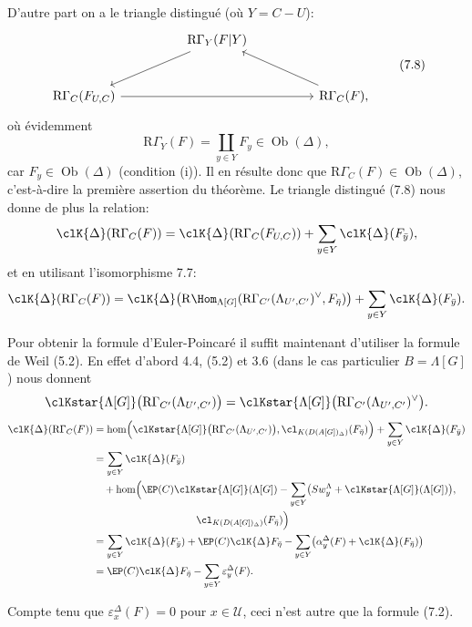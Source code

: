 D'autre part on a le triangle distingué (où $Y=C-U$):
\[
\begin{tikzcd}[column sep=huge,row sep=large]
& \mathrm{R}\Gamma_Y(F|Y) \arrow[dl] & \\
\mathrm{R}\Gamma_C(F_{U,C}) \arrow[rr] && \mathrm{R}\Gamma_C(F), \arrow[ul]
\end{tikzcd}
\tag{7.8}
\]
où évidemment
\[
\mathrm{R}\Gamma_Y(F)=\coprod_{y\in Y}F_y\in\operatorname{Ob}(\Delta),
\]
car $F_y\in\operatorname{Ob}(\Delta)$ (condition (i)). Il en résulte donc que $\mathrm{R}\Gamma_C(F)\in\operatorname{Ob}(\Delta)$, c'est-à-dire la première assertion du théorème. Le triangle distingué (7.8) nous donne de plus la relation:
\[
\clK{\Delta}(\mathrm{R}\Gamma_C(F))
=
\clK{\Delta}(\mathrm{R}\Gamma_C(F_{U,C}))
+\sum_{y\in Y}\clK{\Delta}(F_{\bar y}),
\]
et en utilisant l'isomorphisme 7.7:
\[
\clK{\Delta}(\mathrm{R}\Gamma_C(F))
=
\clK{\Delta}\bigl(\mathrm{R}\Hom_{\Lambda[G]}(\mathrm{R}\Gamma_{C'}(\Lambda_{U',C'})^\vee,F_{\bar\eta})\bigr)
+\sum_{y\in Y}\clK{\Delta}(F_{\bar y}).
\]

Pour obtenir la formule d'Euler-Poincaré il suffit maintenant d'utiliser la formule de Weil (5.2). En effet d'abord 4.4, (5.2) et 3.6 (dans le cas particulier $B=\Lambda[G]$) nous donnent
\[
\clKstar{\Lambda[G]}\bigl(\mathrm{R}\Gamma_{C'}(\Lambda_{U',C'})\bigr)
=
\clKstar{\Lambda[G]}\bigl(\mathrm{R}\Gamma_{C'}(\Lambda_{U',C'})^\vee\bigr).
\]
\[
\begin{aligned}
\clK{\Delta}(\mathrm{R}\Gamma_C(F))
&=\operatorname{hom}\Bigl(
\clKstar{\Lambda[G]}\bigl(\mathrm{R}\Gamma_{C'}(\Lambda_{U',C'})\bigr),
\cl_{K(D(A[G])_\Delta)}(F_{\bar\eta})\Bigr)
 +\sum_{y\in Y}\clK{\Delta}(F_{\bar y})\\
&=\sum_{y\in Y}\clK{\Delta}(F_{\bar y})\\
&\quad +\operatorname{hom}\Bigl(
\EP(C)\clKstar{\Lambda[G]}(\Lambda[G])
 -\sum_{y\in Y}\bigl(Sw_y^{\Lambda}+\clKstar{\Lambda[G]}(\Lambda[G])\bigr),\\
&\hspace{10em}\cl_{K(D(A[G])_\Delta)}(F_{\bar\eta})\Bigr)\\
&=\sum_{y\in Y}\clK{\Delta}(F_{\bar y})
 +\EP(C)\clK{\Delta}F_{\bar\eta}
 -\sum_{y\in Y}\bigl(\alpha_y^\Delta(F)+\clK{\Delta}(F_{\bar\eta})\bigr)\\
&=\EP(C)\clK{\Delta}F_{\bar\eta}
 -\sum_{y\in Y}\varepsilon_y^\Delta(F).
\end{aligned}
\]

Compte tenu que $\varepsilon_x^\Delta(F)=0$ pour $x\in\mathcal{U}$, ceci n'est autre que la formule (7.2).

